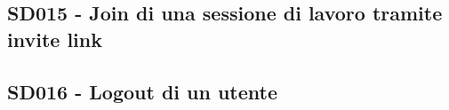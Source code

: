 \documentclass[../main.tex]{subfiles}
\begin{document}
\subsection{SD015 - Join di una sessione di lavoro tramite invite link }
\figure[H]
\centering

\endfigure
\clearpage

\subsection{SD016 - Logout di un utente }
\figure[H]
\centering

\endfigure
\clearpage
\end{document}
